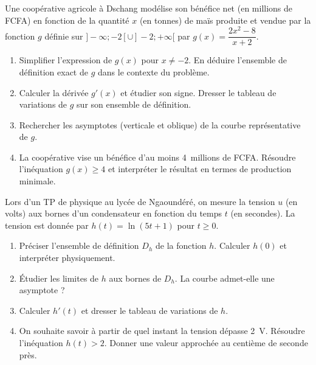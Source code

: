 \documentclass[11pt]{article}
\begin{document}
\begin{exercice}
Une coopérative agricole à Dschang modélise son bénéfice net (en millions de FCFA) en fonction de la quantité $x$ (en tonnes) de maïs produite et vendue par la fonction $g$ définie sur $]-\infty; -2[ \cup ]-2; +\infty[$ par $g(x) = \dfrac{2x^2 - 8}{x + 2}$.
\begin{enumerate}
    \item Simplifier l'expression de $g(x)$ pour $x \neq -2$. En déduire l'ensemble de définition exact de $g$ dans le contexte du problème.
    \item Calculer la dérivée $g'(x)$ et étudier son signe. Dresser le tableau de variations de $g$ sur son ensemble de définition.
    \item Rechercher les asymptotes (verticale et oblique) de la courbe représentative de $g$.
    \item La coopérative vise un bénéfice d'au moins \SI{4}{millions} de FCFA. Résoudre l'inéquation $g(x) \ge 4$ et interpréter le résultat en termes de production minimale.
\end{enumerate}
\end{exercice}

\begin{exercice}
Lors d'un TP de physique au lycée de Ngaoundéré, on mesure la tension $u$ (en volts) aux bornes d'un condensateur en fonction du temps $t$ (en secondes). La tension est donnée par $h(t) = \ln(5t + 1)$ pour $t \ge 0$.
\begin{enumerate}
    \item Préciser l'ensemble de définition $D_h$ de la fonction $h$. Calculer $h(0)$ et interpréter physiquement.
    \item Étudier les limites de $h$ aux bornes de $D_h$. La courbe admet-elle une asymptote ?
    \item Calculer $h'(t)$ et dresser le tableau de variations de $h$.
    \item On souhaite savoir à partir de quel instant la tension dépasse \SI{2}{V}. Résoudre l'inéquation $h(t) > 2$. Donner une valeur approchée au centième de seconde près.
\end{enumerate}
\end{exercice}
\end{document}
